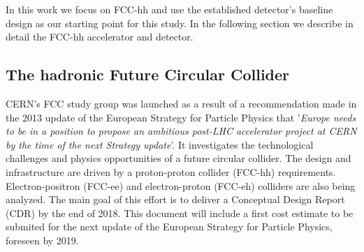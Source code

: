 In this work we focus on FCC-hh and use the established detector's baseline design as our starting point for this study. In the following section we describe in detail the FCC-hh accelerator and detector.

\subsection{The hadronic Future Circular Collider}
\label{section:FCC}

%

CERN's FCC study group was launched as a result of a recommendation made in the  2013 update of the European Strategy for Particle Physics that '\textit{Europe needs to be in a position to propose an ambitious post-LHC accelerator project at CERN by the time of the next Strategy update}'. It investigates the technological challenges and physics opportunities of a future circular collider. The design and infrastructure are driven by a proton-proton collider (FCC-hh) requirements. Electron-positron (FCC-ee) and electron-proton (FCC-eh) colliders are also being analyzed. The main goal of this effort is to deliver a Conceptual Design Report (CDR) by the end of 2018. This document will include a first cost estimate to be submited for the next update of the European Strategy for Particle Physics, foreseen by 2019.

